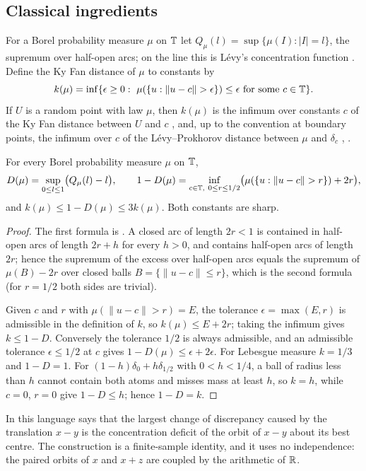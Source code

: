 \documentclass[11pt]{article}
\newcommand{\dist}[1]{\lVert #1\rVert}
\begin{document}
\subsection{Classical ingredients}

For a Borel probability measure $\mu$ on $\mathbb T$ let $Q_\mu(l)=\sup\{\mu(I):|I|=l\}$, the supremum over
half-open arcs; on the line this is L\'evy's concentration function \cite{Levy39}. Define the Ky Fan
distance of $\mu$ to constants by
\[
k(\mu)=\inf\{\epsilon\ge0:\ \mu(\{u:\dist{u-c}>\epsilon\})\le\epsilon\text{ for some }c\in\T\}.
\]
If $U$ is a random point with law $\mu$, then $k(\mu)$ is the infimum over constants $c$ of the Ky Fan
distance between $U$ and $c$ \cite{Fan43}, and, up to the convention at boundary points, the
infimum over $c$ of the Lévy--Prokhorov distance between $\mu$ and $\delta_c$
\cite{Prokhorov56}, \cite[Section~11.3]{Dudley02}.

\begin{proposition}[Concentration]\label{prop:concentration}
For every Borel probability measure $\mu$ on $\mathbb T$,
\[
D(\mu)=\sup_{0\le l\le1}\bigl(Q_\mu(l)-l\bigr),\qquad
1-D(\mu)=\inf_{c\in\T,\ 0\le r\le1/2}\bigl(\mu(\{u:\dist{u-c}>r\})+2r\bigr),
\]
and $k(\mu)\le1-D(\mu)\le3k(\mu)$. Both constants are sharp.
\end{proposition}

\begin{proof}
The first formula is . A closed arc of length $2r<1$ is contained in half-open arcs of
length $2r+h$ for every $h>0$, and contains half-open arcs of length $2r$; hence the supremum of the
excess over half-open arcs equals the supremum of $\mu(B)-2r$ over closed balls
$B=\{\dist{u-c}\le r\}$, which is the second formula (for $r=1/2$ both sides are trivial).

Given $c$ and $r$ with $\mu(\dist{u-c}>r)=E$, the tolerance $\epsilon=\max(E,r)$ is admissible in the
definition of $k$, so $k(\mu)\le E+2r$; taking the infimum gives $k\le1-D$. Conversely the tolerance
$1/2$ is always admissible, and an admissible tolerance $\epsilon\le1/2$ at $c$ gives
$1-D(\mu)\le\epsilon+2\epsilon$. For Lebesgue measure $k=1/3$ and $1-D=1$. For
$(1-h)\delta_0+h\delta_{1/2}$ with $0<h<1/4$, a ball of radius less than $h$ cannot contain both atoms
and misses mass at least $h$, so $k=h$, while $c=0$, $r=0$ give $1-D\le h$; hence $1-D=k$.
\end{proof}

In this language  says that the largest change of discrepancy caused by the
translation $x-y$ is the concentration deficit of the orbit of $x-y$ about its best centre. The
construction is a finite-sample identity, and it uses no independence: the paired orbits of $x$ and
$x+z$ are coupled by the arithmetic of $\mathbb R$.
\end{document}
